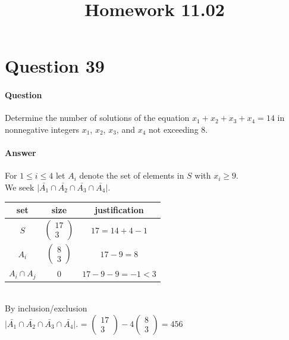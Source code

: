 \documentclass[UTF8]{article}
\title{Homework 11.02}
\date{}
\begin{document}
    \maketitle
    \section{Question 39}
    \paragraph{Question}
    Determine the number of solutions of the equation $ x_{1} + x_{2} + x_{3} + x_{4} = 14 $ in nonnegative integers $ x_{1} $, $ x_{2} $, $ x_{3} $, and $ x_{4} $ not exceeding 8.
    \paragraph{Answer}
    \begin{center}
        For $ 1 \leq i \leq 4 $ let $ A_{i} $ denote the set of elements in $S$ with $x_{i} \geq 9$. \\
        We seek $\vert \bar{A_{1}} \cap \bar{A_{2}} \cap \bar{A_{3}} \cap \bar{A_{4}}\vert. $ \\
        \vspace{6pt}
        \begin{tabular}{c|c|c}
            \toprule
            set & size & justification\\
            \midrule
            $S$ & $\begin{pmatrix} 17 \\ 3 \end{pmatrix}$ & $17 = 14 + 4 - 1$\\
            $A_{i}$ & $\begin{pmatrix} 8 \\ 3 \end{pmatrix}$ & $17 - 9 = 8$\\
            $A_{i} \cap A_{j}$ & $ 0 $ & $17 - 9 - 9 = -1 < 3$\\
            \bottomrule
        \end{tabular} \\
        By inclusion/exclusion \\
        $\vert \bar{A_{1}} \cap \bar{A_{2}} \cap \bar{A_{3}} \cap \bar{A_{4}}\vert. $ = $\begin{pmatrix} 17 \\ 3 \end{pmatrix} - 4\begin{pmatrix} 8 \\ 3 \end{pmatrix} = 456$
    \end{center}
\end{document}
